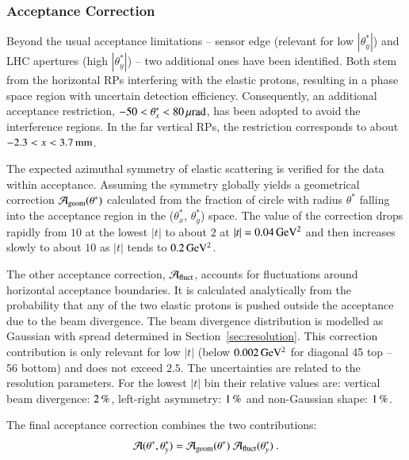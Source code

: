 


\subsubsection{Acceptance Correction}
\label{sec:acc corr}

Beyond the usual acceptance limitations -- sensor edge (relevant for low $|\theta^*_y|$) and LHC apertures (high $|\theta_y^*|$) -- two additional ones have been identified. Both stem from the horizontal RPs interfering with the elastic protons, resulting in a phase space region with uncertain detection efficiency. Consequently, an additional acceptance restriction, $-50 < \theta_x^* < 80\,{\rm \mu rad}$, has been adopted to avoid the interference regions. In the far vertical RPs, the restriction corresponds to about $-2.3 < x < 3.7\,{\rm mm}$.

The expected azimuthal symmetry of elastic scattering is verified for the data within acceptance. Assuming the symmetry globally yields a geometrical correction ${\cal A}_{\rm geom}(\theta^*)$ calculated from the fraction of circle with radius $\theta^*$ falling into the acceptance region in the ($\theta_x^*$, $\theta_y^*$) space. The value of the correction drops rapidly from $10$ at the lowest $|t|$ to about $2$ at $|t| = 0.04\,{\rm GeV^2}$ and then increases slowly to about $10$ as $|t|$ tends to $0.2\,{\rm GeV^2}$.

The other acceptance correction, ${\cal A}_{\rm fluct}$, accounts for fluctuations around horizontal acceptance boundaries. It is calculated analytically from the probability that any of the two elastic protons is pushed outside the acceptance due to the beam divergence. The beam divergence distribution is modelled as Gaussian with spread determined in Section~\ref{sec:resolution}. This correction contribution is only relevant for low $|t|$ (below $0.002\,{\rm GeV^2}$ for diagonal 45 top -- 56 bottom) and does not exceed $2.5$. The uncertainties are related to the resolution parameters. For the lowest $|t|$ bin their relative values are: vertical beam divergence: $2\,{\rm \%}$, left-right asymmetry: $1\,{\rm \%}$ and non-Gaussian shape: $1\,{\rm \%}$.

The final acceptance correction combines the two contributions:
\begin{equation}
{\cal A}(\theta^*, \theta_y^*) = {\cal A}_{\rm geom}(\theta^*)\ {\cal A}_{\rm fluct}(\theta_y^*)\ .
\end{equation}


